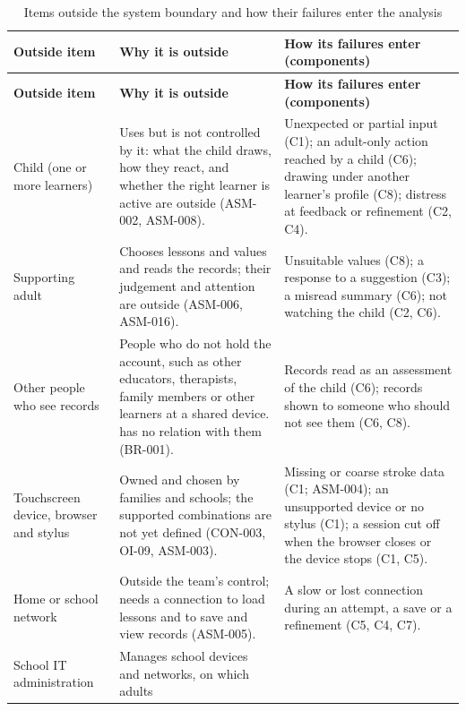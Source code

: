 \documentclass{article}
\begin{document}
{\footnotesize
\setlength{\tabcolsep}{4pt}
\begin{longtable}{@{}
  >{\raggedright\arraybackslash}p{}
  >{\raggedright\arraybackslash}p{}
  >{\raggedright\arraybackslash}p{}@{}} \caption{Items outside the
  system boundary and how their failures enter the
  analysis}\label{tab:outside}\\
\toprule
\textbf{Outside item} & \textbf{Why it is outside} & \textbf{How its failures
enter (components)} \\
\midrule
\endfirsthead
\toprule
\textbf{Outside item} & \textbf{Why it is outside} & \textbf{How its failures
enter (components)} \\
\midrule
\endhead
\bottomrule
\endlastfoot
Child (one or more learners) & Uses \progname{} but is not controlled by it:
what the child draws, how they react, and whether the right learner is active
are outside \progname{} (ASM-002, ASM-008). & Unexpected or partial input (C1);
an adult-only action reached by a child (C6); drawing under another learner's
profile (C8); distress at feedback or refinement (C2, C4). \\
\addlinespace
Supporting adult & Chooses lessons and values and reads the records; their
judgement and attention are outside \progname{} (ASM-006, ASM-016). & Unsuitable
values (C8); a response to a suggestion (C3); a misread summary (C6); not
watching the child (C2, C6). \\
\addlinespace
Other people who see records & People who do not hold the account, such as other
educators, therapists, family members or other learners at a shared device.
\progname{} has no relation with them (BR-001). & Records read as an assessment
of the child (C6); records shown to someone who should not see them (C6, C8). \\
\addlinespace
Touchscreen device, browser and stylus & Owned and chosen by families and
schools; the supported combinations are not yet defined (CON-003, OI-09,
ASM-003). & Missing or coarse stroke data (C1; ASM-004); an unsupported device
or no stylus (C1); a session cut off when the browser closes or the device stops
(C1, C5). \\
\addlinespace
Home or school network & Outside the team's control; \progname{} needs a
connection to load lessons and to save and view records (ASM-005). & A slow or
lost connection during an attempt, a save or a refinement (C5, C4, C7). \\
\addlinespace
School IT administration & Manages school devices and networks, on which adults

\end{longtable}}
\end{document}
